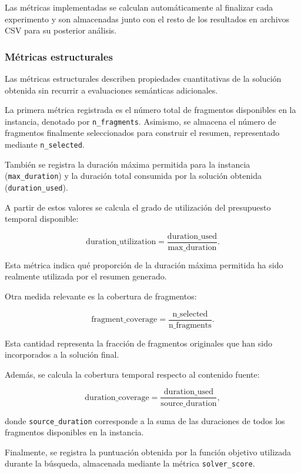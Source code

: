 \documentclass[12pt,a4paper]{article}
\begin{document}
Las métricas implementadas se calculan automáticamente al finalizar cada experimento y son almacenadas junto con el resto de los resultados en archivos CSV para su posterior análisis.

\subsubsection{Métricas estructurales}

Las métricas estructurales describen propiedades cuantitativas de la solución obtenida sin recurrir a evaluaciones semánticas adicionales.

La primera métrica registrada es el número total de fragmentos disponibles en la instancia, denotado por \texttt{n\_fragments}. Asimismo, se almacena el número de fragmentos finalmente seleccionados para construir el resumen, representado mediante \texttt{n\_selected}.

También se registra la duración máxima permitida para la instancia \linebreak (\texttt{max\_duration}) y la duración total consumida por la solución obtenida \linebreak (\texttt{duration\_used}).

A partir de estos valores se calcula el grado de utilización del presupuesto temporal disponible:

\[
\text{duration\_utilization}
=
\frac{\text{duration\_used}}
{\text{max\_duration}}.
\]

Esta métrica indica qué proporción de la duración máxima permitida ha sido realmente utilizada por el resumen generado.

Otra medida relevante es la cobertura de fragmentos:

\[
\text{fragment\_coverage}
=
\frac{\text{n\_selected}}
{\text{n\_fragments}}.
\]

Esta cantidad representa la fracción de fragmentos originales que han sido incorporados a la solución final.

Además, se calcula la cobertura temporal respecto al contenido fuente:

\[
\text{duration\_coverage}
=
\frac{\text{duration\_used}}
{\text{source\_duration}},
\]

donde \texttt{source\_duration} corresponde a la suma de las duraciones de todos los fragmentos disponibles en la instancia.

Finalmente, se registra la puntuación obtenida por la función objetivo utilizada durante la búsqueda, almacenada mediante la métrica \texttt{solver\_score}.
\end{document}
